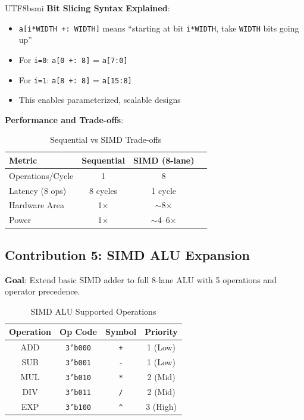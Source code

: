\documentclass[journal,twoside]{IEEEtran}
\begin{document}
\begin{CJK}{UTF8}{bsmi}
\textbf{Bit Slicing Syntax Explained}:
\begin{itemize}
    \item \texttt{a[i*WIDTH +: WIDTH]} means ``starting at bit \texttt{i*WIDTH}, take \texttt{WIDTH} bits going up''
    \item For \texttt{i=0}: \texttt{a[0 +: 8]} = \texttt{a[7:0]}
    \item For \texttt{i=1}: \texttt{a[8 +: 8]} = \texttt{a[15:8]}
    \item This enables parameterized, scalable designs
\end{itemize}

\textbf{Performance and Trade-offs}:
\begin{table}[!t]
\centering
\caption{Sequential vs SIMD Trade-offs}
\footnotesize
\begin{tabular}{@{}lccc@{}}
\toprule
\textbf{Metric} & \textbf{Sequential} & \textbf{SIMD (8-lane)} \\
\midrule
Operations/Cycle & 1 & 8 \\
Latency (8 ops) & 8 cycles & 1 cycle \\
Hardware Area & 1$\times$ & $\sim$8$\times$ \\
Power & 1$\times$ & $\sim$4--6$\times$ \\
\bottomrule
\end{tabular}
\end{table}

\FloatBarrier  %
\subsection{Contribution 5: SIMD ALU Expansion}

\textbf{Goal}: Extend basic SIMD adder to full 8-lane ALU with 5 operations and operator precedence.

\begin{table}[!t]
\centering
\caption{SIMD ALU Supported Operations}
\label{tab:simdops}
\footnotesize
\begin{tabular}{@{}cccc@{}}
\toprule
\textbf{Operation} & \textbf{Op Code} & \textbf{Symbol} & \textbf{Priority} \\
\midrule
ADD & \texttt{3'b000} & \texttt{+} & 1 (Low) \\
SUB & \texttt{3'b001} & \texttt{-} & 1 (Low) \\
MUL & \texttt{3'b010} & \texttt{*} & 2 (Mid) \\
DIV & \texttt{3'b011} & \texttt{/} & 2 (Mid) \\
EXP & \texttt{3'b100} & \texttt{\textasciicircum} & 3 (High) \\
\bottomrule
\end{tabular}
\end{table}


\end{CJK}
\end{document}
